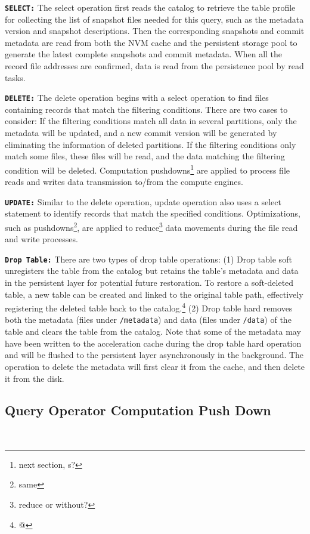 \noindent \textbf{\texttt{SELECT:}} The select operation first reads the catalog to retrieve the table profile for collecting the list of snapshot files needed for this query, such as the metadata version and snapshot descriptions. Then the corresponding snapshots and commit metadata are read from both the NVM cache and the persistent storage pool to generate the latest complete snapshots and commit metadata. When all the record file addresses are confirmed, data is read from the persistence pool by read tasks.

\noindent \textbf{\texttt{DELETE:}} The delete operation begins with a select operation to find files containing records that match the filtering conditions. There are two cases to consider:
If the filtering conditions match all data in several partitions, only the metadata will be updated, and a new commit version will be generated by eliminating the information of deleted partitions.
If the filtering conditions only match some files, these files will be read, and the data matching the filtering condition will be deleted. Computation pushdowns\footnote{next section, s?} are applied to process file reads and writes  data transmission to/from the compute engines.


\noindent \textbf{\texttt{UPDATE:}} Similar to the delete operation, update operation also uses a select statement to identify records that match the specified conditions. Optimizations, such as pushdowns\footnote{same}, are applied to reduce\footnote{reduce or without?} data movements during the file read and write processes.

\noindent \textbf{\texttt{Drop Table:}} There are two types of drop table operations:
 (1) Drop table soft unregisters the table from the catalog but retains the table's metadata and data in the persistent layer for potential future restoration. To restore a soft-deleted table, a new table can be created and linked to the original table path, effectively registering the deleted table back to the catalog.\footnote{@}
(2) Drop table hard  removes both the metadata (files under \texttt{/metadata}) and data (files under \texttt{/data}) of the table and clears the table from the catalog. Note that some of the metadata may have been written to the acceleration cache during the drop table hard operation and will be flushed to the persistent layer asynchronously in the background. The operation to delete the metadata will first clear it from the cache, and then delete it from the disk.

\subsection{Query Operator Computation Push Down}~\label{subsec:pushdown}


